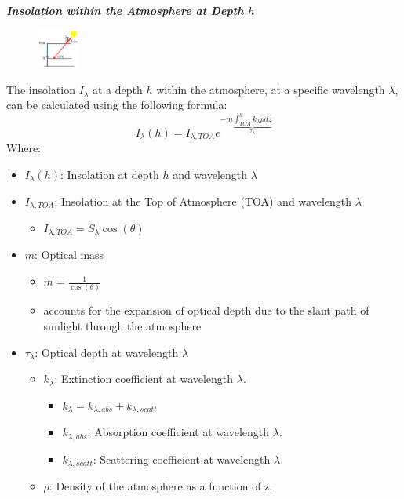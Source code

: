\documentclass[fontsize=8pt, a4paper, landscape, fleqn]{scrartcl}
\renewcommand{\subsubsection}[1]{%
    \noindent\textbf{\textit{\color{subsectioncolor}#1}}%
    \vspace{1mm}%
}
\begin{document}
\begin{multicols*}{3}[\raggedcolumns]
\subsubsection{Insolation within the Atmosphere at Depth $h$}
\begin{figure}
    \centering
    \includegraphics[width=0.12\textwidth]{Secondary/img/Pasted image 20250408114911.png}
\end{figure}
The insolation $I_\lambda$ at a depth $h$ within the atmosphere, at a specific wavelength $\lambda$, can be calculated using the following formula:
$$I_\lambda(h) = I_{\lambda,TOA} e^{-m\underbrace{\int_{TOA}^hk_\lambda\rho dz}_{\tau_\lambda}}$$
Where:
\begin{itemize}
    \item $I_\lambda(h)$: Insolation at depth $h$ and wavelength $\lambda$
    \item $I_{\lambda,TOA}$: Insolation at the Top of Atmosphere (TOA) and wavelength $\lambda$
        \begin{itemize}
            \item $I_{\lambda,TOA} = S_\lambda \cos(\theta)$
        \end{itemize}
    \item $m$: Optical mass
        \begin{itemize}
            \item $m = \frac{1}{\cos(\theta)}$
            \item accounts for the expansion of optical depth due to the slant path of sunlight through the atmosphere
        \end{itemize}
    \item $\tau_\lambda$: Optical depth at wavelength $\lambda$
        \begin{itemize}
            \item $k_\lambda$: Extinction coefficient at wavelength $\lambda$.
                \begin{itemize}
                    \item $k_\lambda = k_{\lambda,abs} + k_{\lambda,scatt}$
                    \item $k_{\lambda,abs}$: Absorption coefficient at wavelength $\lambda$.
                    \item $k_{\lambda,scatt}$: Scattering coefficient at wavelength $\lambda$.
                \end{itemize}
            \item $\rho$: Density of the atmosphere as a function of z.
        \end{itemize}
\end{itemize}


\end{multicols*}
\end{document}
